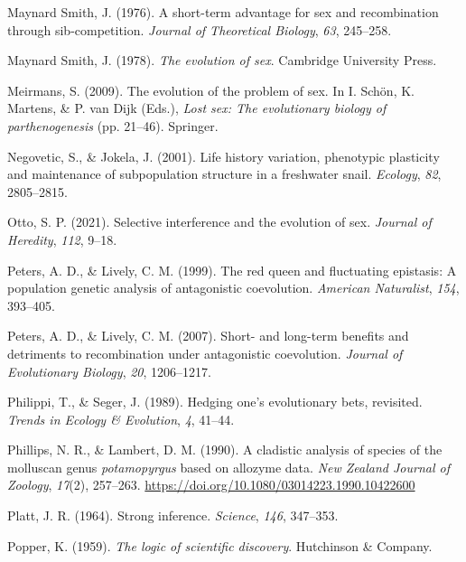 \documentclass[
  letterpaper,
]{book}
\newlength{\cslhangindent}
\newlength{\cslentryspacingunit} %
\newenvironment{CSLReferences}[2] %
 {%
  \setlength{\parindent}{0pt}
  \ifodd #1
  \let\oldpar\par
  \def\par{\hangindent=\cslhangindent\oldpar}
  \fi
  \setlength{\parskip}{#2\cslentryspacingunit}
 }%
 {}
\begin{document}
\begin{CSLReferences}{1}{0}
\leavevmode{}%
Maynard Smith, J. (1976). A short-term advantage for sex and
recombination through sib-competition. \emph{Journal of Theoretical
Biology}, \emph{63}, 245--258.

\leavevmode{}%
Maynard Smith, J. (1978). \emph{The evolution of sex}. Cambridge
University Press.

\leavevmode{}%
Meirmans, S. (2009). The evolution of the problem of sex. In I. Schön,
K. Martens, \& P. van Dijk (Eds.), \emph{Lost sex: The evolutionary
biology of parthenogenesis} (pp. 21--46). Springer.

\leavevmode{}%
Negovetic, S., \& Jokela, J. (2001). Life history variation, phenotypic
plasticity and maintenance of subpopulation structure in a freshwater
snail. \emph{Ecology}, \emph{82}, 2805--2815.

\leavevmode{}%
Otto, S. P. (2021). Selective interference and the evolution of sex.
\emph{Journal of Heredity}, \emph{112}, 9--18.

\leavevmode{}%
Peters, A. D., \& Lively, C. M. (1999). The red queen and fluctuating
epistasis: A population genetic analysis of antagonistic coevolution.
\emph{American Naturalist}, \emph{154}, 393--405.

\leavevmode{}%
Peters, A. D., \& Lively, C. M. (2007). Short- and long-term benefits
and detriments to recombination under antagonistic coevolution.
\emph{Journal of Evolutionary Biology}, \emph{20}, 1206--1217.

\leavevmode{}%
Philippi, T., \& Seger, J. (1989). Hedging one's evolutionary bets,
revisited. \emph{Trends in Ecology \& Evolution}, \emph{4}, 41--44.

\leavevmode{}%
Phillips, N. R., \& Lambert, D. M. (1990). A cladistic analysis of
species of the molluscan genus \emph{potamopyrgus} based on allozyme
data. \emph{New Zealand Journal of Zoology}, \emph{17}(2), 257--263.
\url{https://doi.org/10.1080/03014223.1990.10422600}

\leavevmode{}%
Platt, J. R. (1964). Strong inference. \emph{Science}, \emph{146},
347--353.

\leavevmode{}%
Popper, K. (1959). \emph{The logic of scientific discovery}. Hutchinson
\& Company.


\end{CSLReferences}
\end{document}
